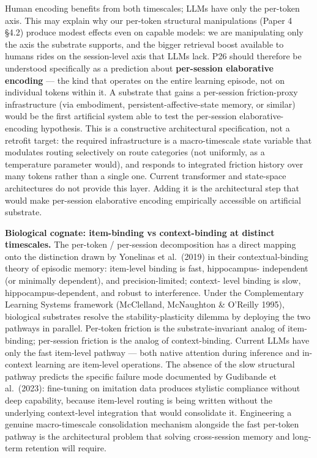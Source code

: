 \documentclass[
]{article}
\begin{document}
Human encoding benefits from both timescales; LLMs have only the
per-token axis. This may explain why our per-token structural
manipulations (Paper 4 §4.2) produce modest effects even on capable
models: we are manipulating only the axis the substrate supports, and
the bigger retrieval boost available to humans rides on the
session-level axis that LLMs lack. P26 should therefore be understood
specifically as a prediction about \textbf{per-session elaborative
encoding} --- the kind that operates on the entire learning episode, not
on individual tokens within it. A substrate that gains a per-session
friction-proxy infrastructure (via embodiment,
persistent-affective-state memory, or similar) would be the first
artificial system able to test the per-session elaborative-encoding
hypothesis. This is a constructive architectural specification, not a
retrofit target: the required infrastructure is a macro-timescale state
variable that modulates routing selectively on route categories (not
uniformly, as a temperature parameter would), and responds to integrated
friction history over many tokens rather than a single one. Current
transformer and state-space architectures do not provide this layer.
Adding it is the architectural step that would make per-session
elaborative encoding empirically accessible on artificial substrate.

\textbf{Biological cognate: item-binding vs context-binding at distinct
timescales.} The per-token / per-session decomposition has a direct
mapping onto the distinction drawn by Yonelinas et al.~(2019) in their
contextual-binding theory of episodic memory: item-level binding is
fast, hippocampus- independent (or minimally dependent), and
precision-limited; context- level binding is slow,
hippocampus-dependent, and robust to interference. Under the
Complementary Learning Systems framework (McClelland, McNaughton \&
O'Reilly 1995), biological substrates resolve the stability-plasticity
dilemma by deploying the two pathways in parallel. Per-token friction is
the substrate-invariant analog of item-binding; per-session friction is
the analog of context-binding. Current LLMs have only the fast
item-level pathway --- both native attention during inference and
in-context learning are item-level operations. The absence of the slow
structural pathway predicts the specific failure mode documented by
Gudibande et al.~(2023): fine-tuning on imitation data produces
stylistic compliance without deep capability, because item-level routing
is being written without the underlying context-level integration that
would consolidate it. Engineering a genuine macro-timescale
consolidation mechanism alongside the fast per-token pathway is the
architectural problem that solving cross-session memory and long-term
retention will require.
\end{document}
